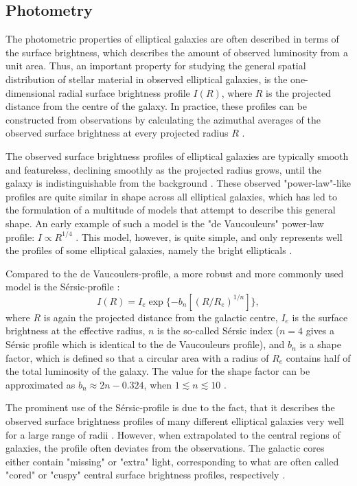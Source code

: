 \documentclass[english, twoside]{HYgradu}
\begin{document}
\subsection{Photometry} \label{section:ellip_photo}

The photometric properties of elliptical galaxies are often described in terms of the surface brightness, which describes the amount of observed luminosity from a unit area. Thus, an important property for studying the general spatial distribution of stellar material in observed elliptical galaxies, is the one-dimensional radial surface brightness profile $I(R)$, where $R$ is the projected distance from the centre of the galaxy. In practice, these profiles can be constructed from observations by calculating the azimuthal averages of the observed surface brightness at every projected radius $R$ \citep{MerrittBook}.

The observed surface brightness profiles of elliptical galaxies are typically smooth and featureless, declining smoothly as the projected radius grows, until the galaxy is indistinguishable from the background \citep{BinneyTremaine}. These observed "power-law"-like profiles are quite similar in shape across all elliptical galaxies, which has led to the formulation of a multitude of models that attempt to describe this general shape. An early example of such a model is the "de Vaucouleurs" power-law profile: $I \propto R^{1/4}$ \citep{deVaucouleurs1948}. This model, however, is quite simple, and only represents well the profiles of some elliptical galaxies, namely the bright ellipticals \citep{MerrittBook}. 

Compared to the de Vaucoulers-profile, a more robust and more commonly used model is the Sérsic-profile \citep{Sersic1968}:
\begin{equation}
I (R) = I_e \exp \{ -b_n \left[ (R / R_e)^{1/n} \right] \},
\end{equation}
where $R$ is again the projected distance from the galactic centre, $I_e$ is the surface brightness at the effective radius, $n$ is the so-called Sérsic index ($n=4$ gives a Sérsic profile which is identical to the de Vaucouleurs profile), and $b_n$ is a shape factor, which is defined so that a circular area with a radius of $R_e$ contains half of the total luminosity of the galaxy. The value for the shape factor can be approximated as $b_n \approx 2n - 0.324$, when $1 \lesssim n \lesssim 10$ \citep{BinneyTremaine}. 

The prominent use of the Sérsic-profile is due to the fact, that it describes the observed surface brightness profiles of many different elliptical galaxies very well for a large range of radii \citep{MerrittBook}. However, when extrapolated to the central regions of galaxies, the profile often deviates from the observations. The galactic cores either contain "missing" or "extra" light, corresponding to what are often called "cored" or "cuspy" central surface brightness profiles, respectively \citep[e.g.][]{Kormendy2009}.
\end{document}
